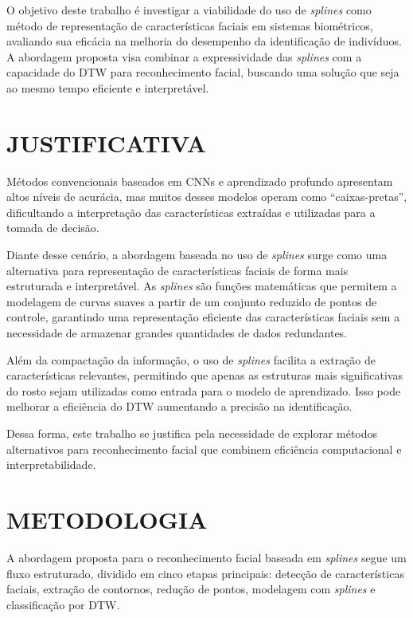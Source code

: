 O objetivo deste trabalho é investigar a viabilidade do uso de \textit{splines} como método de representação de características faciais em sistemas biométricos, avaliando sua eficácia na melhoria do desempenho da identificação de indivíduos. A abordagem proposta visa combinar a expressividade das \textit{splines} com a capacidade do DTW para reconhecimento facial, buscando uma solução que seja ao mesmo tempo eficiente e interpretável.

\section{JUSTIFICATIVA}

Métodos convencionais baseados em CNNs e aprendizado profundo apresentam altos níveis de acurácia, mas muitos desses modelos operam como “caixas-pretas”, dificultando a interpretação das características extraídas e utilizadas para a tomada de decisão.

Diante desse cenário, a abordagem baseada no uso de \textit{splines} surge como uma alternativa para representação de características faciais de forma mais estruturada e interpretável. As \textit{splines} são funções matemáticas que permitem a modelagem de curvas suaves a partir de um conjunto reduzido de pontos de controle, garantindo uma representação eficiente das características faciais sem a necessidade de armazenar grandes quantidades de dados redundantes.

Além da compactação da informação, o uso de \textit{splines} facilita a extração de características relevantes, permitindo que apenas as estruturas mais significativas do rosto sejam utilizadas como entrada para o modelo de aprendizado. Isso pode melhorar a eficiência do DTW aumentando a precisão na identificação.

Dessa forma, este trabalho se justifica pela necessidade de explorar métodos alternativos para reconhecimento facial que combinem eficiência computacional e interpretabilidade.

\section{METODOLOGIA}

A abordagem proposta para o reconhecimento facial baseada em \textit{splines} segue um fluxo estruturado, dividido em cinco etapas principais: detecção de características faciais, extração de contornos, redução de pontos, modelagem com \textit{splines} e classificação por DTW.

